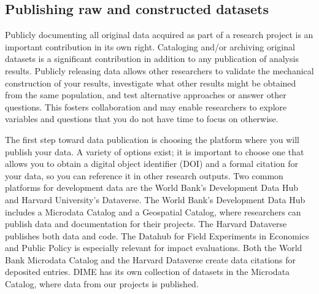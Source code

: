 \subsection{Publishing raw and constructed datasets}

Publicly documenting all original data acquired as part of a research project
is an important contribution in its own right.
Cataloging and/or archiving original datasets
is a significant contribution in addition to any publication of analysis results.
Publicly releasing data allows other researchers
to validate the mechanical construction of your results,
investigate what other results might be obtained from the same population,
and test alternative approaches or answer other questions.
This fosters collaboration and may enable researchers to explore variables and
questions that you do not have time to focus on otherwise.

The first step toward data publication is choosing the platform where you will publish your data.
A variety of options exist;
it is important to choose one that allows you to obtain a digital object identifier (DOI)
and a formal citation for your data, so you can reference it in other research outputs.
Two common platforms for development data are the World Bank's Development Data Hub
and Harvard University's Dataverse.
The World Bank's Development Data Hub
includes a Microdata Catalog
and a Geospatial Catalog,
where researchers can publish data and documentation for their projects.
The Harvard Dataverse
publishes both data and code.
The Datahub for Field Experiments in Economics and Public Policy
is especially relevant for impact evaluations.
Both the World Bank Microdata Catalog and the Harvard Dataverse
create data citations for deposited entries.
DIME has its own collection of datasets in the Microdata Catalog,
where data from our projects is published.

